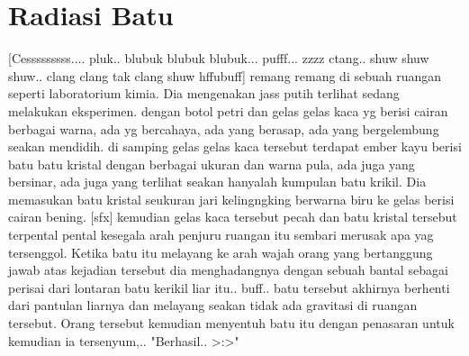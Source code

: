 \chapter{Radiasi Batu}

[Cesssssssss.... pluk.. blubuk blubuk blubuk... pufff... zzzz ctang.. shuw shuw shuw.. clang clang tak clang shuw hffubuff] remang remang di sebuah ruangan seperti laboratorium kimia. Dia mengenakan jass putih terlihat sedang melakukan eksperimen. dengan botol petri dan gelas gelas kaca yg berisi cairan berbagai warna, ada yg bercahaya, ada yang berasap, ada yang bergelembung seakan mendidih. di samping gelas gelas kaca tersebut terdapat ember kayu berisi batu batu kristal dengan berbagai ukuran dan warna pula, ada juga yang bersinar, ada juga yang terlihat seakan hanyalah kumpulan batu krikil. Dia memasukan batu kristal seukuran jari kelingngking berwarna biru ke gelas berisi cairan bening. [sfx] kemudian gelas kaca tersebut pecah dan batu kristal tersebut terpental pental kesegala arah penjuru ruangan itu sembari merusak apa yag tersenggol. Ketika batu itu melayang ke arah wajah orang yang bertanggung jawab atas kejadian tersebut dia menghadangnya dengan sebuah bantal sebagai perisai dari lontaran batu kerikil liar itu.. buff..
batu tersebut akhirnya berhenti dari pantulan liarnya dan melayang seakan tidak ada gravitasi di ruangan tersebut. Orang tersebut kemudian menyentuh batu itu dengan penasaran untuk kemudian ia tersenyum,.. "Berhasil.. >:>"
